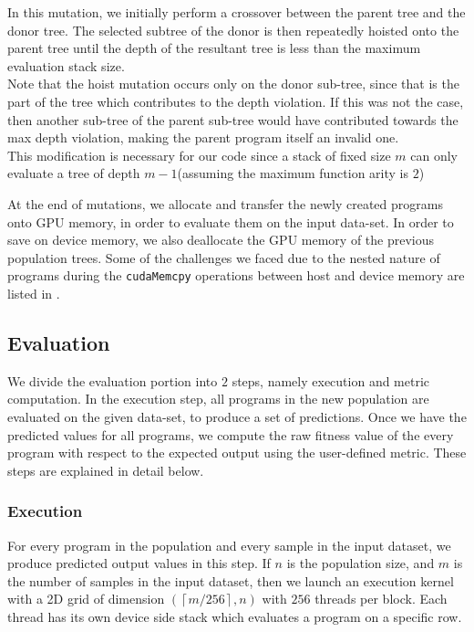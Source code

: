 In this mutation, we initially perform a crossover between the parent tree and the donor tree. The selected subtree of the donor is then repeatedly hoisted onto the parent tree until the depth of the resultant tree is less than the maximum evaluation stack size. \\
Note that the hoist mutation occurs only on the donor sub-tree, since that is the part of the tree which contributes to the depth violation. If this was not the case, then another sub-tree of the parent sub-tree would have contributed towards the max depth violation, making the parent program itself an invalid one. \\
This modification is necessary for our code since a stack of fixed size $m$ can only evaluate a tree of depth $m-1$(assuming the maximum function arity is $2$)

At the end of mutations, we allocate and transfer the newly created programs onto GPU memory, in order to evaluate them on the input data-set. In order to save on device memory, we also deallocate the GPU memory of the previous population trees. Some of the challenges we faced due to the nested nature of programs during the \lstinline!cudaMemcpy! operations between host and device memory are listed in . 

\subsection{Evaluation}
\label{ow:evaluation}
We divide the evaluation portion into $2$ steps, namely execution and metric computation. In the execution step, all programs in the new population are evaluated on the given data-set, to produce a set of predictions. Once we have the predicted values for all programs, we compute the raw fitness value of the every program with respect to the expected output using the user-defined metric. These steps are explained in detail below.  

\subsubsection{Execution}
\label{subsec:execute}
For every program in the population and every sample in the input dataset, we produce predicted output values in this step. If $n$ is the population size, and $m$ is the number of samples in the input dataset, then we launch an execution kernel with a 2D grid of dimension $(\left\lceil m/256\right\rceil ,n)$ with $256$ threads per block. Each thread has its own device side stack which evaluates a program on a specific row.

